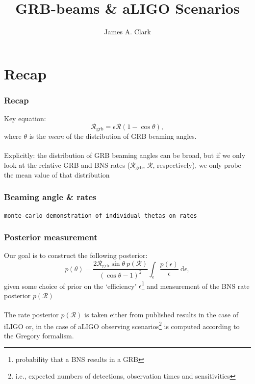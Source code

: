 \documentclass{beamer}
\newcommand{\grbrate}{{{\mathcal R}_{\mathrm{grb}}}}
\newcommand{\cbcrate}{{{\mathcal R}}}
\newcommand{\diff}{{\mathrm d}}
\begin{document}
\title{GRB-beams \& aLIGO Scenarios}
\author{James A. Clark}
\date{} 

\begin{frame}[plain]
\titlepage
\end{frame}


\section{Recap}
\begin{frame}
\frametitle{Recap}
Key equation:
\begin{equation}\label{eq:rate2angle}
\grbrate=\epsilon\cbcrate(1-\cos \theta),
\end{equation}
where $\theta$ is the \emph{mean} of the distribution of GRB beaming angles. \\~\\

Explicitly: the distribution of GRB beaming angles can be broad, but if we only
look at the relative GRB and BNS rates ($\grbrate$, $\cbcrate$, respectively),
we only probe the mean value of that distribution

\end{frame}

\begin{frame}
    \frametitle{Beaming angle \& rates}
    {\tt monte-carlo demonstration of individual thetas on rates}
\end{frame}

\begin{frame}
    \frametitle{Posterior measurement}

    Our goal is to construct the following posterior:
    \begin{equation}\label{eq:marginaltheta}
        p(\theta) = \frac{2\grbrate \sin
        \theta~p(\cbcrate)}{(\cos\theta-1)^2}\int_{\epsilon} \frac{p(\epsilon)}{\epsilon} ~\diff
        \epsilon,
    \end{equation}
    given some choice of prior on the `efficiency'
    $\epsilon$\footnote{probability that a BNS results in a GRB} and measurement
    of the BNS rate posterior $p(\cbcrate)$ \\~\\

    The rate posterior $p(\cbcrate)$ is taken either from published results in
    the case of iLIGO or, in the case of aLIGO observing
    scenarios\footnote{i.e., expected numbers of detections, observation times
    and sensitivities} is computed according to the Gregory formalism.

\end{frame}
\end{document}
